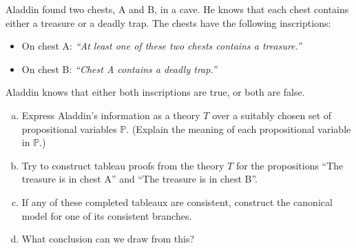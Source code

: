 \begin{problem}
    
    Aladdin found two chests, A and B, in a cave. He knows that each chest contains either a treasure or a deadly trap. The chests have the following inscriptions:
    \begin{itemize}
    \item On chest A: {\it ``At least one of these two chests contains a treasure.''}
    \item On chest B: {\it ``Chest A contains a deadly trap.''}
    \end{itemize}
    Aladdin knows that either both inscriptions are true, or both are false.
    \begin{enumerate}[(a)]
        \item Express Aladdin's information as a theory $T$ over a suitably chosen set of propositional variables $\mathbb P$. (Explain the meaning of each propositional variable in $\mathbb P$.)
        \item Try to construct tableau proofs from the theory $T$ for the propositions ``The treasure is in chest A'' and ``The treasure is in chest B''.
        \item If any of these completed tableaux are consistent, construct the canonical model for one of its consistent branches.
        \item What conclusion can we draw from this?
    \end{enumerate}


\end{problem}
